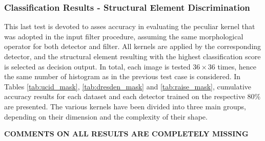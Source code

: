 \documentclass[review]{elsarticle}
\begin{document}
\subsubsection{Classification Results - Structural Element Discrimination}
This last test is devoted to asses accuracy in evaluating the peculiar kernel that was adopted in the input filter procedure, assuming the same morphological operator for both detector and filter. All kernels are applied by the corresponding detector, and the structural element resulting with the highest classification score is selected as decision output. In total, each image is tested $36\times 36$ times, hence the same number of histogram as in the previous test case is considered. In Tables \ref{tab:ucid_mask}, \ref{tab:dresden_mask} and \ref{tab:raise_mask}, cumulative accuracy results for each dataset and each detector trained on the respective $80\%$ are presented. The various kernels have been divided into three main groups, depending on their dimension and the complexity of their shape.

\textbf{COMMENTS ON ALL RESULTS ARE COMPLETELY MISSING}
\end{document}
